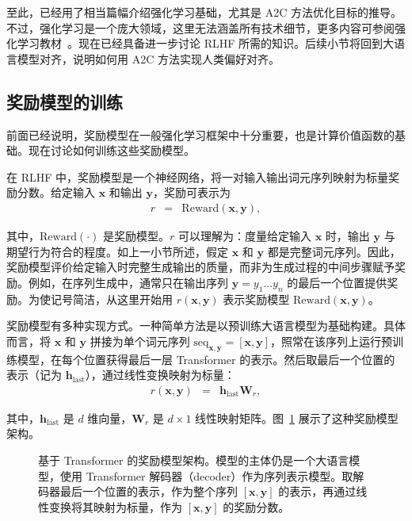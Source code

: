 至此，已经用了相当篇幅介绍强化学习基础，尤其是 A2C 方法优化目标的推导。不过，强化学习是一个庞大领域，这里无法涵盖所有技术细节，更多内容可参阅强化学习教材~\cite{Sutton-and-Barto:2018RL,szepesvari:2010algorithms}。现在已经具备进一步讨论 RLHF 所需的知识。后续小节将回到大语言模型对齐，说明如何用 A2C 方法实现人类偏好对齐。

\subsection{奖励模型的训练}
\label{sec:training-reward-models}

\noindent 前面已经说明，奖励模型在一般强化学习框架中十分重要，也是计算价值函数的基础。现在讨论如何训练这些奖励模型。

在 RLHF 中，奖励模型是一个神经网络，将一对输入输出词元序列映射为标量奖励分数。给定输入 $\mathbf{x}$ 和输出 $\mathbf{y}$，奖励可表示为
\begin{eqnarray}
r & = & \mathrm{Reward}(\mathbf{x},\mathbf{y}),
\end{eqnarray}

\noindent 其中，$\mathrm{Reward}(\cdot)$ 是奖励模型。$r$ 可以理解为：度量给定输入 $\mathbf{x}$ 时，输出 $\mathbf{y}$ 与期望行为符合的程度。如上一小节所述，假定 $\mathbf{x}$ 和 $\mathbf{y}$ 都是完整词元序列。因此，奖励模型评价给定输入时完整生成输出的质量，而非为生成过程的中间步骤赋予奖励。例如，在序列生成中，通常只在输出序列 $\mathbf{y}=y_1...y_n$ 的最后一个位置提供奖励。为使记号简洁，从这里开始用 $r(\mathbf{x},\mathbf{y})$ 表示奖励模型 $\mathrm{Reward}(\mathbf{x},\mathbf{y})$。

奖励模型有多种实现方式。一种简单方法是以预训练大语言模型为基础构建。具体而言，将 $\mathbf{x}$ 和 $\mathbf{y}$ 拼接为单个词元序列 $\mathrm{seq}_{\mathbf{x},\mathbf{y}} = [\mathbf{x}, \mathbf{y}]$，照常在该序列上运行预训练模型，在每个位置获得最后一层 Transformer 的表示。然后取最后一个位置的表示（记为 $\mathbf{h}_{\mathrm{last}}$），通过线性变换映射为标量：
\begin{eqnarray}
r(\mathbf{x},\mathbf{y}) & = & \mathbf{h}_{\mathrm{last}} \mathbf{W}_{r},
\end{eqnarray}

\noindent 其中，$\mathbf{h}_{\mathrm{last}}$ 是 $d$ 维向量，$\mathbf{W}_{r}$ 是 $d \times 1$ 线性映射矩阵。图~\ref{fig:reward-model-architecture} 展示了这种奖励模型架构。

\begin{figure}[!t]
\centering

\caption{基于 Transformer 的奖励模型架构。模型的主体仍是一个大语言模型，使用 Transformer 解码器（decoder）作为序列表示模型。取解码器最后一个位置的表示，作为整个序列 $[\mathbf{x},\mathbf{y}]$ 的表示，再通过线性变换将其映射为标量，作为 $[\mathbf{x},\mathbf{y}]$ 的奖励分数。}
\label{fig:reward-model-architecture}
\end{figure}

